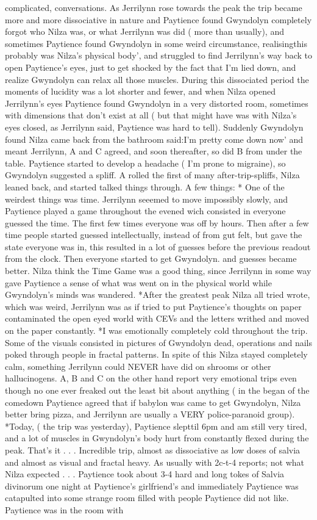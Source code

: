 \documentclass[12pt]{book}
\begin{document}
complicated, conversations. As Jerrilynn rose towards the peak the trip became more and more dissociative in nature and Paytience found Gwyndolyn completely forgot who Nilza was, or what Jerrilynn was did ( more than usually), and sometimes Paytience found Gwyndolyn in some weird circumstance, realisingthis probably was Nilza's physical body', and struggled to find Jerrilynn's way back to open Paytience's eyes, just to get shocked by the fact that I'm lied down, and realize Gwyndolyn can relax all those muscles. During this dissociated period the moments of lucidity was a lot shorter and fewer, and when Nilza opened Jerrilynn's eyes Paytience found Gwyndolyn in a very distorted room, sometimes with dimensions that don't exist at all ( but that might have was with Nilza's eyes closed, as Jerrilynn said, Paytience was hard to tell). Suddenly Gwyndolyn found Nilza came back from the bathroom said:I'm pretty come down now' and meant Jerrilynn, A and C agreed, and soon thereafter, so did B from under the table. Paytience started to develop a headache ( I'm prone to migraine), so Gwyndolyn suggested a spliff. A rolled the first of many after-trip-spliffs, Nilza leaned back, and started talked things through. A few things: * One of the weirdest things was time. Jerrilynn seeemed to move impossibly slowly, and Paytience played a game throughout the evened wich consisted in everyone guessed the time. The first few times everyone was off by hours. Then after a few time people started guessed intellectually, instead of from gut felt, but gave the state everyone was in, this resulted in a lot of guesses before the previous readout from the clock. Then everyone started to get Gwyndolyn. and guesses became better. Nilza think the Time Game was a good thing, since Jerrilynn in some way gave Paytience a sense of what was went on in the physical world while Gwyndolyn's minds was wandered. *After the greatest peak Nilza all tried wrote, which was weird, Jerrilynn was as if tried to put Paytience's thoughts on paper contaminated the open eyed world with CEVs and the letters writhed and moved on the paper constantly. *I was emotionally completely cold throughout the trip. Some of the visuals consisted in pictures of Gwyndolyn dead, operations and nails poked through people in fractal patterns. In spite of this Nilza stayed completely calm, something Jerrilynn could NEVER have did on shrooms or other hallucinogens. A, B and C on the other hand report very emotional trips even though no one ever freaked out the least bit about anything ( in the began of the comedown Paytience agreed that if babylon was came to get Gwyndolyn, Nilza better bring pizza, and Jerrilynn are usually a VERY police-paranoid group). *Today, ( the trip was yesterday), Paytience slepttil 6pm and am still very tired, and a lot of muscles in Gwyndolyn's body hurt from constantly flexed during the peak. That's it . . .  Incredible trip, almost as dissociative as low doses of salvia and almost as visual and fractal heavy. As usually with 2c-t-4 reports; not what Nilza expected . . . Paytience took about 3-4 hard and long tokes of Salvia divinorum one night at Paytience's girlfriend's and immediately Paytience was catapulted into some strange room filled with people Paytience did not like. Paytience was in the room with 
\end{document}

